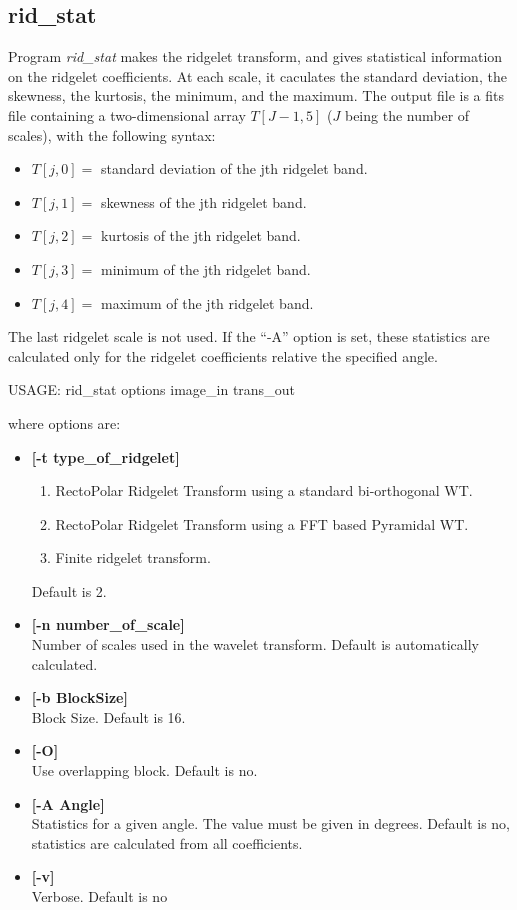 \subsection{rid\_stat}
Program {\em rid\_stat} makes the  ridgelet transform, and 
gives statistical information on the ridgelet coefficients.
At each scale, it caculates the standard deviation, the skewness,
the kurtosis, the minimum, and the maximum. The output file is a 
fits file containing a two-dimensional array $T[J-1,5]$ ($J$ being the
number of scales), with the following syntax:
\begin{itemize}
\baselineskip=0.4truecm
\itemsep=0.1truecm
\item $T[j,0] = $ standard deviation of the jth ridgelet band.
\item $T[j,1] = $ skewness of the jth ridgelet band.
\item $T[j,2] = $ kurtosis of the jth ridgelet band.
\item $T[j,3] = $ minimum of the jth ridgelet band.
\item $T[j,4] = $ maximum of the jth ridgelet band.
\end{itemize}
The last ridgelet scale is not used.
If the ``-A'' option is set, these statistics are calculated only for 
the ridgelet coefficients relative the specified angle.
{\bf
\begin{center}
 USAGE: rid\_stat options image\_in trans\_out
\end{center}}
where options are:

\begin{itemize}
\baselineskip=0.4truecm
\itemsep=0.1truecm
\item {\bf [-t type\_of\_ridgelet]}  
\begin{enumerate}
\baselineskip=0.4truecm
\itemsep=0.1truecm
\item RectoPolar Ridgelet Transform using a standard bi-orthogonal WT.
\item RectoPolar Ridgelet Transform using a FFT based Pyramidal WT.
\item Finite ridgelet transform.
\end{enumerate}
Default is 2.
\item {\bf [-n number\_of\_scale]} \\
 Number of scales used in the wavelet transform.
 Default is automatically calculated.
\item {\bf [-b BlockSize]} \\
Block Size. Default is 16.
\item {\bf [-O]} \\
   Use overlapping block. Default is no.
\item {\bf [-A Angle]} \\
 Statistics for a given angle. The value must be given  in degrees.
 Default is no, statistics are calculated from all coefficients.
\item {\bf [-v]} \\
Verbose. Default is no
\end{itemize}

